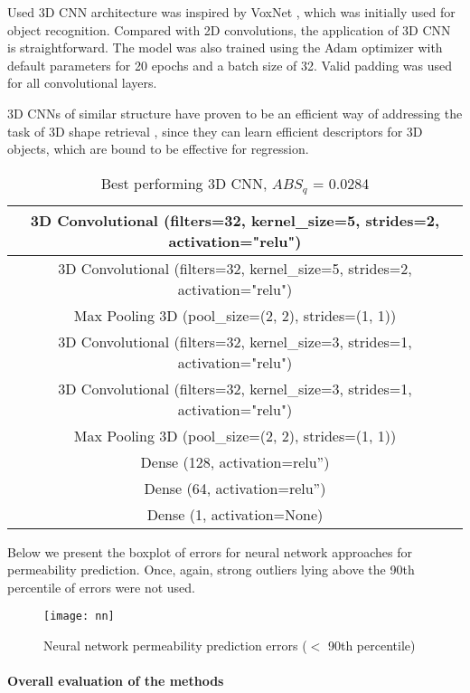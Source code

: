 \documentclass[review]{elsarticle}
\begin{document}
Used 3D CNN architecture was inspired by VoxNet \cite{maturana2015voxnet}, which was initially used for object recognition. Compared with 2D convolutions, the application of 3D CNN is straightforward. The model was also trained using the Adam optimizer with default parameters for 20 epochs and a batch size of 32. Valid padding was used for all convolutional layers.

3D CNNs of similar structure have proven to be an efficient way of addressing the task of 3D shape retrieval \cite{notchenko2017large}, since they can learn efficient descriptors for 3D objects, which are bound to be effective for regression.

\begin{table}[H]
  \centering
  \caption{Best performing 3D CNN, $ABS_q$ = 0.0284} \label{tab:tab8}
  \begin{tabular}{ | c |}
    \hline
    3D Convolutional (filters=32, kernel\_size=5, strides=2, activation="relu") \\ \hline
    3D Convolutional (filters=32, kernel\_size=5, strides=2, activation="relu") \\ \hline
    Max Pooling 3D (pool\_size=(2, 2), strides=(1, 1)) \\ \hline
    3D Convolutional (filters=32, kernel\_size=3, strides=1, activation="relu") \\ \hline
    3D Convolutional (filters=32, kernel\_size=3, strides=1, activation="relu") \\ \hline
    Max Pooling 3D (pool\_size=(2, 2), strides=(1, 1)) \\ \hline
    Dense (128, activation=relu”) \\ \hline
    Dense (64, activation=relu”) \\ \hline
    Dense (1, activation=None) \\ \hline
  \end{tabular}
\end{table}

Below we present the boxplot of errors for neural network approaches for permeability prediction. Once, again, strong outliers lying above the 90th percentile of errors were not used.

\begin{figure}[H]
    \centering
  \texttt{[image: nn]}
    \caption{Neural network permeability prediction errors ($<$ 90th percentile)}
\end{figure}

\paragraph{Overall evaluation of the methods}
\end{document}
